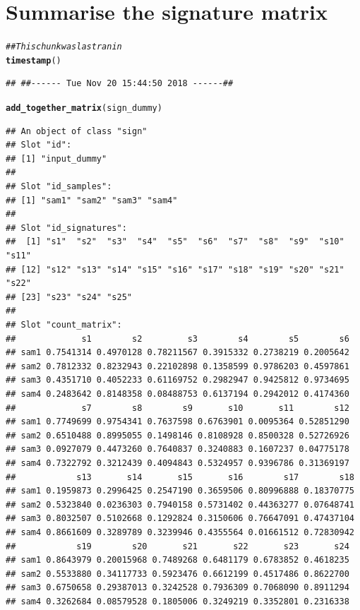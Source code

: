\documentclass{article}\usepackage[]{graphicx}\usepackage[]{color}
\makeatletter
\newcommand{\hlcom}[1]{\textcolor[rgb]{0.678,0.584,0.686}{\textit{#1}}}%
\newcommand{\hlstd}[1]{\textcolor[rgb]{0.345,0.345,0.345}{#1}}%
\newcommand{\hlkwd}[1]{\textcolor[rgb]{0.737,0.353,0.396}{\textbf{#1}}}%
\newenvironment{kframe}{%
 \def\at@end@of@kframe{}%
 \ifinner\ifhmode%
  \def\at@end@of@kframe{\end{minipage}}%
  \begin{minipage}{\columnwidth}%
 \fi\fi%
 \def\FrameCommand##1{\hskip\@totalleftmargin \hskip-\fboxsep
 \colorbox{shadecolor}{##1}\hskip-\fboxsep
     \hskip-\linewidth \hskip-\@totalleftmargin \hskip\columnwidth}%
 \MakeFramed {\advance\hsize-\width
   \@totalleftmargin\z@ \linewidth\hsize
   \@setminipage}}%
 {\par\unskip\endMakeFramed%
 \at@end@of@kframe}
\newenvironment{knitrout}{}{} %
\makeatother
\begin{document}
\section{Summarise the signature matrix}
\begin{knitrout}
\color{fgcolor}\begin{kframe}
\begin{alltt}
\hlcom{## This chunk was last ran in}
\hlkwd{timestamp}\hlstd{()}
\end{alltt}
\begin{verbatim}
## ##------ Tue Nov 20 15:44:50 2018 ------##
\end{verbatim}
\begin{alltt}
\hlkwd{add_together_matrix}\hlstd{(sign_dummy)}
\end{alltt}
\begin{verbatim}
## An object of class "sign"
## Slot "id":
## [1] "input_dummy"
## 
## Slot "id_samples":
## [1] "sam1" "sam2" "sam3" "sam4"
## 
## Slot "id_signatures":
##  [1] "s1"  "s2"  "s3"  "s4"  "s5"  "s6"  "s7"  "s8"  "s9"  "s10" "s11"
## [12] "s12" "s13" "s14" "s15" "s16" "s17" "s18" "s19" "s20" "s21" "s22"
## [23] "s23" "s24" "s25"
## 
## Slot "count_matrix":
##             s1        s2         s3        s4        s5        s6
## sam1 0.7541314 0.4970128 0.78211567 0.3915332 0.2738219 0.2005642
## sam2 0.7812332 0.8232943 0.22102898 0.1358599 0.9786203 0.4597861
## sam3 0.4351710 0.4052233 0.61169752 0.2982947 0.9425812 0.9734695
## sam4 0.2483642 0.8148358 0.08488753 0.6137194 0.2942012 0.4174360
##             s7        s8        s9       s10       s11        s12
## sam1 0.7749699 0.9754341 0.7637598 0.6763901 0.0095364 0.52851290
## sam2 0.6510488 0.8995055 0.1498146 0.8108928 0.8500328 0.52726926
## sam3 0.0927079 0.4473260 0.7640837 0.3240883 0.1607237 0.04775178
## sam4 0.7322792 0.3212439 0.4094843 0.5324957 0.9396786 0.31369197
##            s13       s14       s15       s16        s17        s18
## sam1 0.1959873 0.2996425 0.2547190 0.3659506 0.80996888 0.18370775
## sam2 0.5323840 0.0236303 0.7940158 0.5731402 0.44363277 0.07648741
## sam3 0.8032507 0.5102668 0.1292824 0.3150606 0.76647091 0.47437104
## sam4 0.8661609 0.3289789 0.3239946 0.4355564 0.01661512 0.72830942
##            s19        s20       s21       s22       s23       s24
## sam1 0.8643979 0.20015968 0.7489268 0.6481179 0.6783852 0.4618235
## sam2 0.5533880 0.34117733 0.5923476 0.6612199 0.4517486 0.8622700
## sam3 0.6750658 0.29387013 0.3242528 0.7936309 0.7068090 0.8911294
## sam4 0.3262684 0.08579528 0.1805006 0.3249219 0.3352801 0.2316338

\end{verbatim}
\end{kframe}
\end{knitrout}
\end{document}

